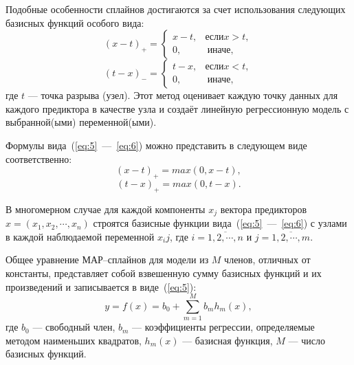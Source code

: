 Подобные особенности сплайнов достигаются за счет использования следующих базисных функций особого вида:
\begin{equation}
(x - t)_{+} = \begin{cases}
                  x - t, & если x > t, \\
                  0, &~\text{иначе},
\end{cases}
\label{eq:5}
\end{equation}
\begin{equation}
(t - x)_{-} = \begin{cases}
                  t - x, & если x < t, \\
                  0, &~\text{иначе},
\end{cases}
\label{eq:6}
\end{equation}
где $t$ --- точка разрыва (узел).
Этот метод оценивает каждую точку данных для каждого предиктора в качестве узла и создаёт линейную регрессионную модель с выбранной(ыми) переменной(ыми).

Формулы вида~(\ref{eq:5}~---~\ref{eq:6}) можно представить в следующем виде соответственно:
\begin{equation}
(x - t)_{+} = max(0, x - t),
\end{equation}
\begin{equation}
(t - x)_{+} = max(0, t - x).
\end{equation}

В многомерном случае для каждой компоненты $x_j$ вектора предикторов $x = (x_1, x_2, \cdots, x_n)$ строятся базисные функции вида~(\ref{eq:5}~---~\ref{eq:6}) с узлами в каждой наблюдаемой переменной $x_ij$, где $i = \overline{1, 2, \cdots, n}$ и $j = \overline{1, 2, \cdots, m}$.

Общее уравнение МАР--сплайнов для модели из $M$ членов, отличных от константы, представляет собой взвешенную сумму базисных функций и их произведений и записывается в виде~(\ref{eq:5}):
\begin{equation}
    y = f(x) = b_0 + \sum_{m=1}^{M} b_m h_m(x),
\end{equation}
где $b_0$ --- свободный член, $b_m$ --- коэффициенты регрессии, определяемые методом наименьших квадратов, $h_m(x)$ --- базисная функция, $M$ --- число базисных функций.

